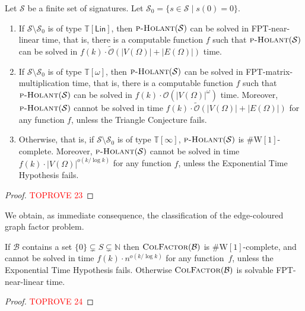 \documentclass[authorcolumns,numberwithinsect]{no-lipics-v2022}
\newcommand{\W}{\mathrm{W}}
\newcommand{\holantprob}{\text{\sc{p-Holant}}}
\begin{document}
\begin{theorem}\label{thm:holant_trichotomy_zero}
Let $\mathcal{S}$ be a finite set of signatures. Let $\mathcal{S}_0 = \{s \in \mathcal{S} \mid s(0) = 0\}$.
\begin{enumerate}
\item If $\mathcal{S}\setminus\mathcal{S}_0$ is of type $\mathbb{T}[\mathsf{Lin}]$, then $\holantprob(\mathcal{S})$ can be solved in FPT-near-linear time, that is, there is a computable function $f$ such that $\holantprob(\mathcal{S})$ can be solved in $f(k)\cdot\tilde{\mathcal{O}}(|V(\Omega)| + |E(\Omega)|)$ time.
\item If $\mathcal{S}\setminus\mathcal{S}_0$ is of type $\mathbb{T}[\omega]$, then $\holantprob(\mathcal{S})$ can be solved in FPT-matrix-multiplication time, that is, there is a computable function $f$ such that $\holantprob(\mathcal{S})$ can be solved in $f(k)\cdot\mathcal{O}(|V(\Omega)|^{\omega})$ time. Moreover, $\textsc{p-Holant}(\mathcal{S})$ cannot be solved in time $f(k)\cdot \tilde{\mathcal{O}}(|V(\Omega)|+|E(\Omega)|)$ for any function $f$, unless the Triangle Conjecture fails.
\item Otherwise, that is, if $\mathcal{S}\setminus\mathcal{S}_0$ is of type $\mathbb{T}[\infty]$, $\holantprob(\mathcal{S})$ is $\#\mathrm{W}[1]$-complete. Moreover, $\textsc{p-Holant}(\mathcal{S})$ cannot be solved in time $f(k)\cdot |V(\Omega)|^{o(k/\log k)}$ for any function $f$, unless the Exponential Time Hypothesis fails.
\end{enumerate}
\end{theorem}
\begin{proof}\textcolor{red}{TOPROVE 23}\end{proof}

We obtain, as immediate consequence, the classification of the edge-coloured graph factor problem.
\begin{corollary}\label{cor:factor_classification_col}
    If $\mathcal{B}$ contains a set $\{0\} \subsetneq S \subsetneq \mathbb{N}$ then $\textsc{ColFactor}(\mathcal{B})$ is $\#\W[1]$-complete, and cannot be solved in time $f(k)\cdot n^{o(k/\log k)}$ for any function~$f$, unless the Exponential Time Hypothesis fails. Otherwise $\textsc{ColFactor}(\mathcal{B})$ is solvable FPT-near-linear time.
\end{corollary}
\begin{proof}\textcolor{red}{TOPROVE 24}\end{proof}
\end{document}
